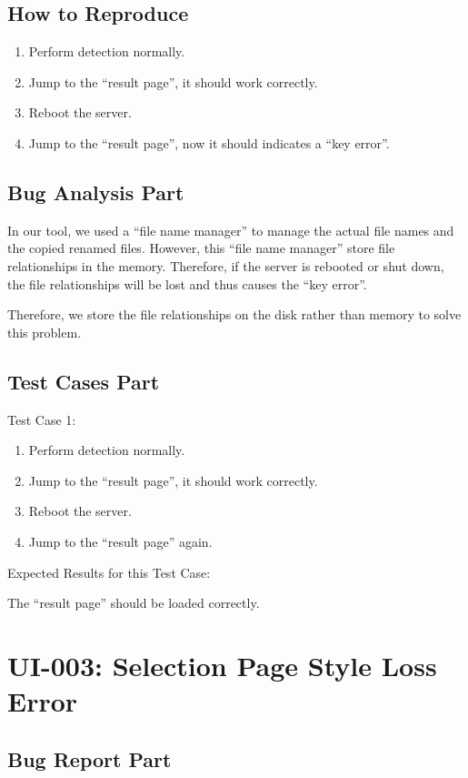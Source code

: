 \documentclass[twoside,a4paper]{refart}
\newcommand{\bugfourth}{UI-003: Selection Page Style Loss Error}
\begin{document}
\subsection*{How to Reproduce}
\begin{enumerate}
\item Perform detection normally.
\item Jump to the \enquote{result page}, it should work correctly.
\item Reboot the server.
\item Jump to the \enquote{result page}, now it should indicates a \enquote{key error}.
\end{enumerate}

\subsection{Bug Analysis Part}
In our tool, we used a \enquote{file name manager} to manage the actual file names and the copied renamed files. However, this \enquote{file name manager} store file relationships in the memory. Therefore, if the server is rebooted or shut down, the file relationships will be lost and thus causes the \enquote{key error}.

Therefore, we store the file relationships on the disk rather than memory to solve this problem.

\subsection{Test Cases Part}
Test Case 1:
\begin{enumerate}
\item Perform detection normally.
\item Jump to the \enquote{result page}, it should work correctly.
\item Reboot the server.
\item Jump to the \enquote{result page} again.
\end{enumerate}

Expected Results for this Test Case: 

The \enquote{result page} should be loaded correctly.

\section{\bugfourth}
\subsection{Bug Report Part}
\end{document}
